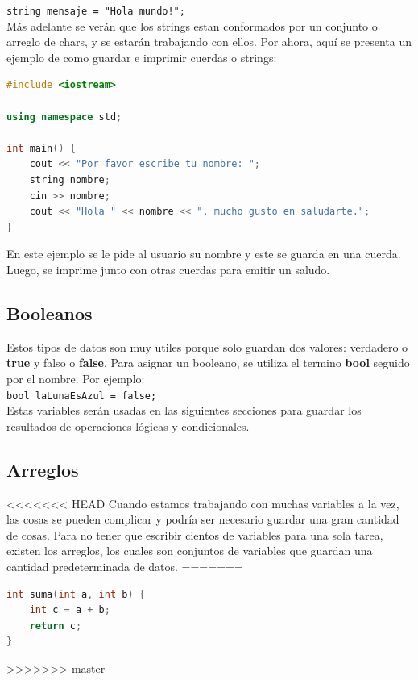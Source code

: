 \documentclass{article}
\begin{document}
\lstinline{string mensaje = "Hola mundo!";} \\

Más adelante se verán que los strings estan conformados por un conjunto o arreglo de chars, y se estarán trabajando con ellos. Por ahora, aquí se presenta un ejemplo de como guardar e imprimir cuerdas o strings:

\begin{lstlisting}[language=C++, title=Usando strings]
#include <iostream>

using namespace std;

int main() {
	cout << "Por favor escribe tu nombre: ";
	string nombre;
	cin >> nombre;
	cout << "Hola " << nombre << ", mucho gusto en saludarte.";
}
\end{lstlisting}

En este ejemplo se le pide al usuario su nombre y este se guarda en una cuerda. Luego, se imprime junto con otras cuerdas para emitir un saludo.

\subsection{Booleanos}

Estos tipos de datos son muy utiles porque solo guardan dos valores: verdadero o \textbf{true} y falso o \textbf{false}. Para asignar un booleano, se utiliza el termino \textbf{bool} seguido por el nombre. Por ejemplo: \\

\lstinline{bool laLunaEsAzul = false;} \\

Estas variables serán usadas en las siguientes secciones para guardar los resultados de operaciones lógicas y condicionales.

\subsection{Arreglos}

<<<<<<< HEAD
Cuando estamos trabajando con muchas variables a la vez, las cosas se pueden complicar y podría ser necesario guardar una gran cantidad de cosas. Para no tener que escribir cientos de variables para una sola tarea, existen los arreglos, los cuales son conjuntos de variables que guardan una cantidad predeterminada de datos.
=======
\begin{lstlisting}[language=C++, title=Función de suma]
int suma(int a, int b) {
	int c = a + b;
	return c;
}
\end{lstlisting}
>>>>>>> master
\end{document}
